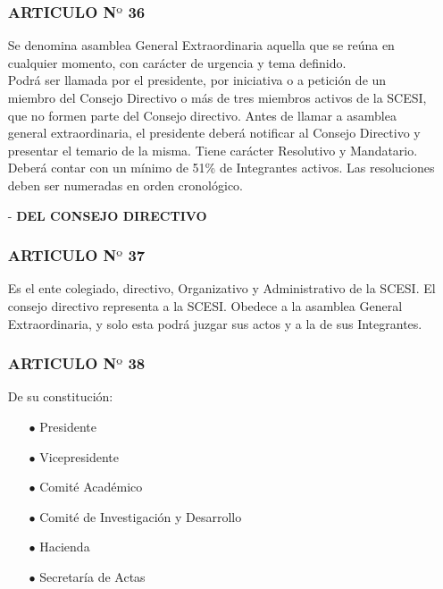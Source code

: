 \documentclass[11pt,letterpaper]{book}
\begin{document}
\begin{itemize}
\subsubsection*{ARTICULO N$º$ 36}
Se denomina asamblea General Extraordinaria aquella que se reúna en cualquier momento, con carácter de urgencia y tema definido.\\
Podrá ser llamada por el presidente, por iniciativa o a petición de un miembro del Consejo Directivo o más de tres miembros activos de la SCESI, que no formen parte del Consejo directivo. Antes de llamar a asamblea general extraordinaria, el presidente deberá notificar al Consejo Directivo y presentar el temario de la misma. Tiene carácter Resolutivo y Mandatario. Deberá contar con un mínimo de 51\% de Integrantes activos. Las resoluciones deben ser numeradas en orden cronológico. 
\item[-] {\bf DEL CONSEJO DIRECTIVO}
\subsubsection*{ARTICULO N$º$ 37}
Es el ente colegiado, directivo, Organizativo y Administrativo de la SCESI. El consejo directivo representa a la SCESI. Obedece a la asamblea General Extraordinaria, y solo esta podrá juzgar sus actos y a la de sus Integrantes.

\subsubsection*{ARTICULO N$º$ 38}
De su constitución: 
\begin{itemize}
\item[$\bullet$] Presidente 
\item[$\bullet$] Vicepresidente 
\item[$\bullet$] Comité Académico 
\item[$\bullet$] Comité de Investigación y Desarrollo 
\item[$\bullet$] Hacienda 
\item[$\bullet$] Secretaría de Actas
\end{itemize}

\end{itemize}
\end{document}
